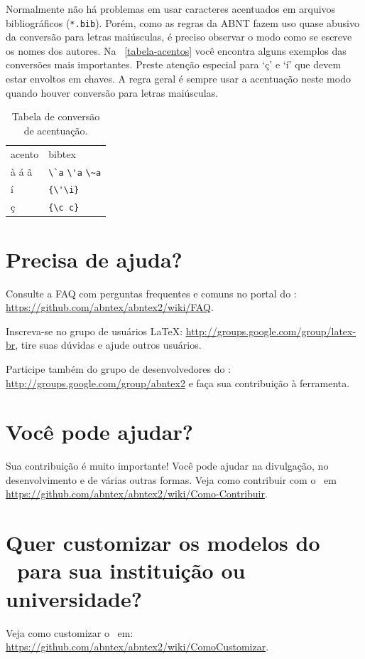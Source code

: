 Normalmente não há problemas em usar caracteres acentuados em arquivos
bibliográficos (\texttt{*.bib}). Porém, como as regras da ABNT fazem uso quase
abusivo da conversão para letras maiúsculas, é preciso observar o modo como se
escreve os nomes dos autores. Na ~\autoref{tabela-acentos} você encontra alguns
exemplos das conversões mais importantes. Preste atenção especial para `ç' e `í'
que devem estar envoltos em chaves. A regra geral é sempre usar a acentuação
neste modo quando houver conversão para letras maiúsculas.

\begin{table}[htbp]
\caption{Tabela de conversão de acentuação.}
\label{tabela-acentos}

\begin{center}
\begin{tabular}{ll}\hline\hline
acento & \textsf{bibtex}\\
à á ã & \verb+\`a+ \verb+\'a+ \verb+\~a+\\
í & \verb+{\'\i}+\\
ç & \verb+{\c c}+\\
\hline\hline
\end{tabular}
\end{center}
\end{table}


\section{Precisa de ajuda?}

Consulte a FAQ com perguntas frequentes e comuns no portal do \abnTeX:
\url{https://github.com/abntex/abntex2/wiki/FAQ}.

Inscreva-se no grupo de usuários \LaTeX:
\url{http://groups.google.com/group/latex-br}, tire suas dúvidas e ajude
outros usuários.

Participe também do grupo de desenvolvedores do \abnTeX:
\url{http://groups.google.com/group/abntex2} e faça sua contribuição à
ferramenta.

\section{Você pode ajudar?}

Sua contribuição é muito importante! Você pode ajudar na divulgação, no
desenvolvimento e de várias outras formas. Veja como contribuir com o \abnTeX\
em \url{https://github.com/abntex/abntex2/wiki/Como-Contribuir}.

\section{Quer customizar os modelos do \abnTeX\ para sua instituição ou
universidade?}

Veja como customizar o \abnTeX\ em:
\url{https://github.com/abntex/abntex2/wiki/ComoCustomizar}.
